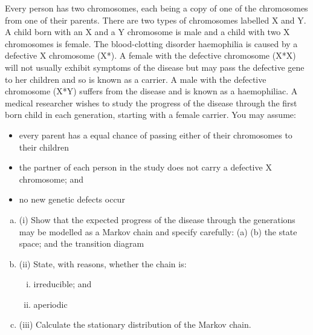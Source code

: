 \documentclass[a4paper,12pt]{article}
\begin{document}
Every person has two chromosomes, each being a copy of one of the chromosomes
from one of their parents. There are two types of chromosomes labelled X and Y. A
child born with an X and a Y chromosome is male and a child with two X
chromosomes is female.
The blood-clotting disorder haemophilia is caused by a defective X chromosome
(X*). A female with the defective chromosome (X*X) will not usually exhibit
symptoms of the disease but may pass the defective gene to her children and so is
known as a carrier. A male with the defective chromosome (X*Y) suffers from the
disease and is known as a haemophiliac.
A medical researcher wishes to study the progress of the disease through the first born
child in each generation, starting with a female carrier.
You may assume:
\begin{itemize}
\item every parent has a equal chance of passing either of their chromosomes to their
children
\item the partner of each person in the study does not carry a defective X chromosome;
and
\item no new genetic defects occur
\end{itemize}

\begin{enumerate}[(a)]
\item (i)
Show that the expected progress of the disease through the generations may be
modelled as a Markov chain and specify carefully:
(a)
(b)
the state space; and
the transition diagram

\item (ii)
State, with reasons, whether the chain is:
\begin{enumerate}[(i)]
\item 
irreducible; and
\item aperiodic
\end{enumerate}

\item  (iii)
Calculate the stationary distribution of the Markov chain.
\end{enumerate}
\end{document}
